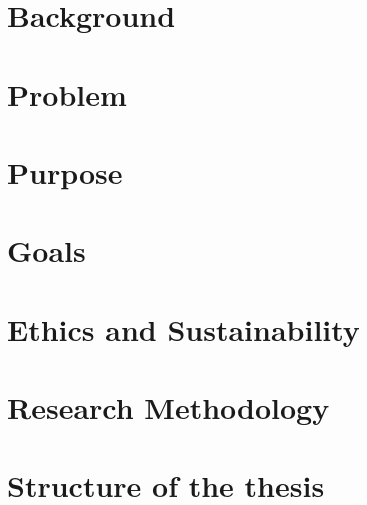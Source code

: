 

\section{Background}
    \label{sec:intro_background}
    

\section{Problem}
    \label{sec:intro_problem}
    

\section{Purpose}
    \label{sec:intro_purpose}
    

\section{Goals}
    \label{sec:intro_goals}
    

\section{Ethics and Sustainability}
    \label{sec:intro_ethics_and_sustainability}
    

\section{Research Methodology}
    \label{sec:intro_research_methodology}
    

\section{Structure of the thesis}
    \label{sec:intro_structure_thesis}
    